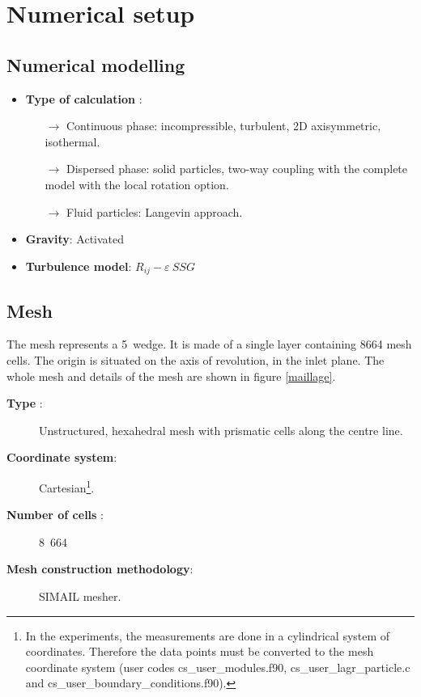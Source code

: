 \section{Numerical setup}

\subsection{Numerical modelling}

\begin{itemize}

   \item \textbf{Type of calculation} :
         \begin{itemize}
            \item[$\rightarrow$] Continuous phase: incompressible, turbulent, 2D axisymmetric, isothermal.
            \item[$\rightarrow$] Dispersed phase: solid particles, two-way coupling with the complete model with the local rotation option.
            \item[$\rightarrow$] Fluid particles: Langevin approach.
         \end{itemize}

   \item \textbf{Gravity}: Activated

   \item \textbf{Turbulence model}: $R_{ij}-\varepsilon~SSG$

\end{itemize}

\subsection{Mesh}

The mesh represents a 5\textdegree\  wedge. It is made of a single layer containing 8664 mesh cells. The origin is situated on the axis of revolution, in the inlet plane. The whole mesh and details of the mesh are shown in figure \ref{maillage}.

\begin{description}

   \item[\textbf{Type} :] Unstructured, hexahedral mesh with prismatic cells along the centre line.

   \item[\textbf{Coordinate system}:] Cartesian\footnote{In the experiments, the measurements are done in a cylindrical system of coordinates. Therefore the data points must be converted to the mesh coordinate system (user codes cs\_user\_modules.f90,
            cs\_user\_lagr\_particle.c and cs\_user\_boundary\_conditions.f90).}.

   \item[\textbf{Number of cells} :] 8~664

   \item[\textbf{Mesh construction methodology}:] SIMAIL mesher.


\end{description}

